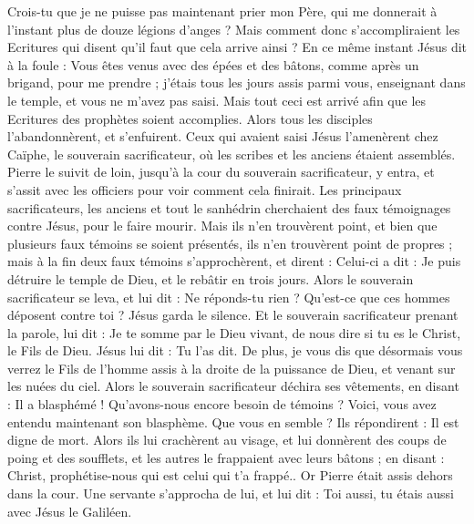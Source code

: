 \begin{multicols}{2}
Crois-tu que je ne puisse pas maintenant prier mon Père, qui me donnerait à l’instant plus de douze légions d'anges ?
Mais comment donc s’accompliraient les Ecritures qui disent qu'il faut que cela arrive ainsi ?
En ce même instant Jésus dit à la foule : Vous êtes venus avec des épées et des bâtons, comme après un brigand, pour me prendre ; j'étais tous les jours assis parmi vous, enseignant dans le temple, et vous ne m'avez pas saisi.
Mais tout ceci est arrivé afin que les Ecritures des prophètes soient accomplies. Alors tous les disciples l'abandonnèrent, et s'enfuirent.
Ceux qui avaient saisi Jésus l'amenèrent chez Caïphe, le souverain sacrificateur, où les scribes et les anciens étaient assemblés.
Pierre le suivit de loin, jusqu’à la cour du souverain sacrificateur, y entra, et s’assit avec les officiers pour voir comment cela finirait.
Les principaux sacrificateurs, les anciens et tout le sanhédrin cherchaient des faux témoignages contre Jésus, pour le faire mourir.
Mais ils n’en trouvèrent point, et bien que plusieurs faux témoins se soient présentés, ils n’en trouvèrent point de propres ; mais à la fin deux faux témoins s’approchèrent,
et dirent : Celui-ci a dit : Je puis détruire le temple de Dieu, et le rebâtir en trois jours.
Alors le souverain sacrificateur se leva, et lui dit : Ne réponds-tu rien ? Qu’est-ce que ces hommes déposent contre toi ?
Jésus garda le silence. Et le souverain sacrificateur prenant la parole, lui dit : Je te somme par le Dieu vivant, de nous dire si tu es le Christ, le Fils de Dieu.
Jésus lui dit : Tu l'as dit. De plus, je vous dis que désormais vous verrez le Fils de l'homme assis à la droite de la puissance de Dieu, et venant sur les nuées du ciel.
Alors le souverain sacrificateur déchira ses vêtements, en disant : Il a blasphémé ! Qu’avons-nous encore besoin de témoins ? Voici, vous avez entendu maintenant son blasphème. Que vous en semble ?
Ils répondirent : Il est digne de mort.
Alors ils lui crachèrent au visage, et lui donnèrent des coups de poing et des soufflets, et les autres le frappaient avec leurs bâtons ;
en disant : Christ, prophétise-nous qui est celui qui t’a frappé..
Or Pierre était assis dehors dans la cour. Une servante s'approcha de lui, et lui dit : Toi aussi, tu étais aussi avec Jésus le Galiléen.

\end{multicols}
